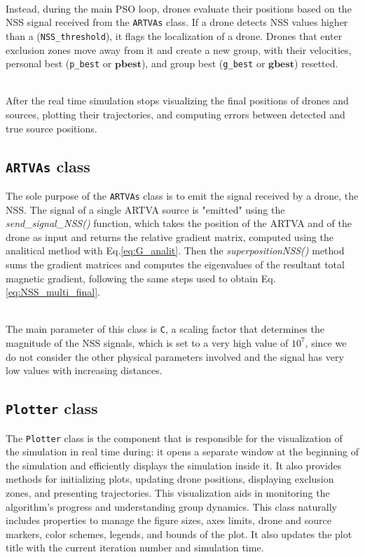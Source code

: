 \noindent\\
Instead, during the main PSO loop, drones evaluate 
their positions based on the NSS signal received from the \texttt{ARTVAs} class. 
If a drone detects NSS values higher than a (\texttt{NSS\_threshold}),
it flags the localization of a drone.
Drones that enter exclusion zones move away from it and 
create a new group, with their velocities, 
personal best (\texttt{p\_best} or $\mathbf{pbest}$), and group best 
(\texttt{g\_best} or $\mathbf{gbest}$) resetted.

\noindent\\
After the real time simulation stops visualizing the final 
positions of drones and sources, plotting their trajectories, 
and computing errors between detected and true source positions.

\subsection{\texttt{ARTVAs} class}
The sole purpose of the \texttt{ARTVAs} class is to 
emit the signal received by a drone, the NSS. 
The signal of a single ARTVA source is "emitted" using the \textit{send\_signal\_NSS()} 
function, which takes the position of the ARTVA and of the drone as 
input and returns the relative gradient matrix,
computed using the analitical method with Eq.\ref{eq:G_analit}.
Then the \textit{superpositionNSS()} method sums 
the gradient matrices and computes the eigenvalues of the resultant 
total magnetic gradient,
following the same steps used to obtain Eq.\ref{eq:NSS_multi_final}.

\noindent\\
The main parameter of this class is \texttt{C}, a 
scaling factor that determines the magnitude of the NSS signals, 
which is set to a very high value of $10^7$, since we do not consider
the other physical parameters involved and the signal has very low values
with increasing distances.

\subsection{\texttt{Plotter} class}
The \texttt{Plotter} class is the component that is responsible 
for the visualization of the simulation in real time during: 
it opens a separate window at the beginning
of the simulation and efficiently displays the simulation inside it.
It also provides methods for initializing plots, updating drone positions, 
displaying exclusion zones, and presenting trajectories. 
This visualization aids in monitoring the algorithm's 
progress and understanding group dynamics.
This class naturally includes properties to manage 
the figure sizes, axes limits, drone and source markers, color schemes, 
legends, and bounds of the plot.
It also updates the plot title with the current iteration 
number and simulation time.

